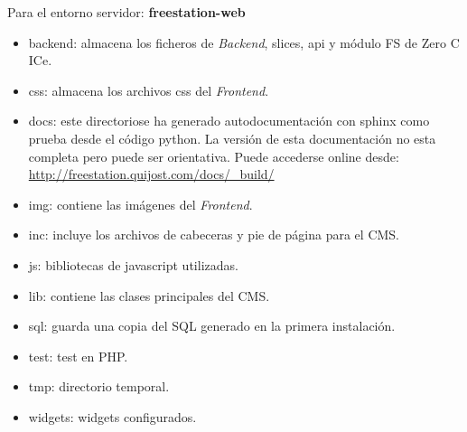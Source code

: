     Para el entorno servidor:
    \textbf{freestation-web}
    \begin{itemize}
      \item backend: almacena los ficheros de \emph{Backend}, slices, api y
      módulo FS de Zero C ICe.
      \item css: almacena los archivos css del \emph{Frontend}.
      \item docs: este directoriose ha generado autodocumentación con sphinx
      como prueba desde el código python. La versión de esta documentación no esta completa pero
      puede ser orientativa. Puede accederse online desde:
      \url{http://freestation.quijost.com/docs/\_build/}
      \item img: contiene las imágenes del \emph{Frontend}.
      \item inc: incluye los archivos de cabeceras y pie de página para el CMS.
      \item js: bibliotecas de javascript utilizadas.
      \item lib: contiene las clases principales del CMS.
      \item sql: guarda una copia del SQL generado en la primera instalación.
      \item test: test en PHP.
      \item tmp: directorio temporal.
      \item widgets: widgets configurados.
    \end{itemize}
    
    \cleardoublepage
    
